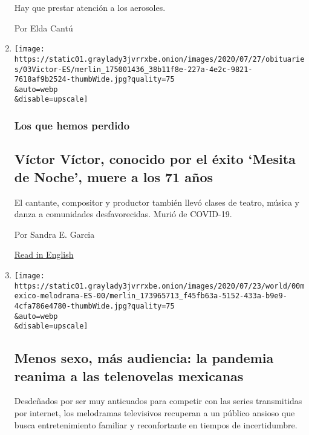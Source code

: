 \begin{enumerate}
  Hay que prestar atención a los aerosoles.

  Por Elda Cantú
\item
  \href{/es/2020/08/03/espanol/cultura/victor-victor-murio-coronavirus.html}{}

  \texttt{[image: https://static01.graylady3jvrrxbe.onion/images/2020/07/27/obituaries/03Victor-ES/merlin\_175001436\_38b11f8e-227a-4e2c-9821-7618af9b2524-thumbWide.jpg?quality=75\\\&auto=webp\\\&disable=upscale]}

  \hypertarget{los-que-hemos-perdido}{%
  \subsubsection{Los que hemos perdido}\label{los-que-hemos-perdido}}

  \hypertarget{vuxedctor-vuxedctor-conocido-por-el-uxe9xito-mesita-de-noche-muere-a-los-71-auxf1os}{%
  \subsection{Víctor Víctor, conocido por el éxito `Mesita de Noche',
  muere a los 71
  años}\label{vuxedctor-vuxedctor-conocido-por-el-uxe9xito-mesita-de-noche-muere-a-los-71-auxf1os}}

  El cantante, compositor y productor también llevó clases de teatro,
  música y danza a comunidades desfavorecidas. Murió de COVID-19.

  Por Sandra E. Garcia

  \href{https://www.nytimes3xbfgragh.onion/2020/08/01/obituaries/victor-victor-dead-coronavirus.html}{Read
  in English}
\item
  \href{/es/2020/08/02/espanol/america-latina/televisa-rosa-de-guadalupe-netflix.html}{}

  \texttt{[image: https://static01.graylady3jvrrxbe.onion/images/2020/07/23/world/00mexico-melodrama-ES-00/merlin\_173965713\_f45fb63a-5152-433a-b9e9-4cfa786e4780-thumbWide.jpg?quality=75\\\&auto=webp\\\&disable=upscale]}

  \hypertarget{menos-sexo-muxe1s-audiencia-la-pandemia-reanima-a-las-telenovelas-mexicanas}{%
  \subsection{Menos sexo, más audiencia: la pandemia reanima a las
  telenovelas
  mexicanas}\label{menos-sexo-muxe1s-audiencia-la-pandemia-reanima-a-las-telenovelas-mexicanas}}

  Desdeñados por ser muy anticuados para competir con las series
  transmitidas por internet, los melodramas televisivos recuperan a un
  público ansioso que busca entretenimiento familiar y reconfortante en
  tiempos de incertidumbre.


\end{enumerate}

